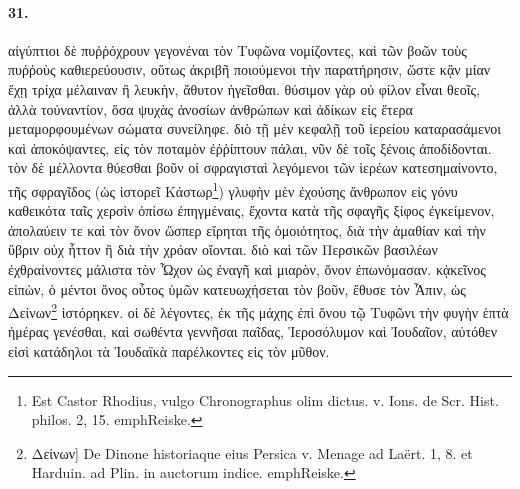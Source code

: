 \documentclass[a4paper, 11pt, oneside, polutonikogreek, german]{article}
\begin{document}
\paragraph{31.}
αἰγύπτιοι δὲ πυῤῥόχρουν γεγονέναι τὸν Τυφῶνα νομίζοντες, καὶ τῶν βοῶν τοὺς πυῤῥοὺς καθιερεύουσιν, οὕτως ἀκριβῆ ποιούμενοι τὴν παρατήρησιν, ὥστε κᾂν μίαν ἔχῃ τρίχα μέλαιναν ἢ λευκὴν, ἄθυτον ἡγεῖσθαι. θύσιμον γὰρ οὐ φίλον εἶναι θεοῖς, ἀλλὰ τοὐναντίον, ὅσα ψυχὰς ἀνοσίων ἀνθρώπων καὶ ἀδίκων εἰς ἕτερα μεταμορφουμένων σώματα συνείληφε. διὸ τῇ μὲν κεφαλῇ τοῦ ἱερείου καταρασάμενοι καὶ ἀποκόψαντες, εἰς τὸν ποταμὸν ἐῤῥίπτουν πάλαι, νῦν δὲ τοῖς ξένοις ἀποδίδονται. τὸν δὲ μέλλοντα θύεσθαι βοῦν οἱ σφραγισταὶ λεγόμενοι τῶν ἱερέων κατεσημαίνοντο, τῆς σφραγῖδος (ὡς ἱστορεῖ Κάστωρ\footnote{Est Castor Rhodius, vulgo Chronographus olim dictus. v. Ions. de Scr. Hist. philos. 2, 15. emph{Reiske.}}) γλυφὴν μὲν ἐχούσης ἄνθρωπον εἰς γόνυ καθεικότα ταῖς χερσὶν ὀπίσω ἐπηγμέναις, ἔχοντα κατὰ τῆς σφαγῆς ξίφος ἐγκείμενον, ἀπολαύειν τε καὶ τὸν ὄνον ὥσπερ εἴρηται τῆς ὁμοιότητος, διὰ τὴν ἀμαθίαν καὶ τὴν ὕβριν οὐχ ἧττον ἢ διὰ τὴν χρόαν οἴονται. διὸ καὶ τῶν Περσικῶν βασιλέων ἐχθραίνοντες μάλιστα τὸν Ὦχον ὡς ἐναγῆ καὶ μιαρὸν, ὄνον ἐπωνόμασαν. κᾀκεῖνος εἰπὼν, ὁ μέντοι ὄνος οὗτος ὑμῶν κατευωχήσεται τὸν βοῦν, ἔθυσε τὸν Ἆπιν, ὡς Δείνων\footnote{Δείνων] De Dinone historiaque eius Persica v. Menage ad Laërt. 1, 8. et Harduin. ad Plin. in auctorum indice. emph{Reiske.}} ἱστόρηκεν. οἱ δὲ λέγοντες, ἐκ τῆς μάχης ἐπὶ ὄνου τῷ Τυφῶνι τὴν φυγὴν ἑπτὰ ἡμέρας γενέσθαι, καὶ σωθέντα γεννῆσαι παῖδας, Ἱεροσόλυμον καὶ Ἰουδαῖον, αὐτόθεν εἰσὶ κατάδηλοι τὰ Ἰουδαϊκὰ παρέλκοντες εἰς τὸν μῦθον.
\end{document}
